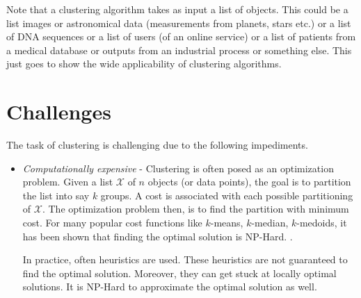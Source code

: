 \documentclass[letterpaper,12pt,titlepage,oneside,final]{book}
\newcommand{\mc}{\mathcal}
\begin{document}
Note that a clustering algorithm takes as input a list of objects. This could be a list images or astronomical data (measurements from planets, stars etc.) or a list of DNA sequences or a list of users (of an online service) or a list of patients from a medical database or outputs from an industrial process or something else. This just goes to show the wide applicability of clustering algorithms. 

\section{Challenges}
\label{introduction:challenges}
The task of clustering is challenging due to the following impediments. 
\begin{itemize}
	\item \emph{Computationally expensive} - Clustering is often posed as an optimization problem. Given a list $\mc X$ of $n$ objects (or data points), the goal is to partition the list into say $k$ groups. A cost is associated with each possible partitioning of $\mc X$. The optimization problem then, is to find the partition with minimum cost. For many popular cost functions like $k$-means, $k$-median, $k$-medoids, it has been shown that finding the optimal solution is NP-Hard. \cite{dasgupta2008hardness,megiddo1984complexity}. 
	
	In practice, often heuristics are used. These heuristics are not guaranteed to find the optimal solution. Moreover, they can get stuck at locally optimal solutions. It is NP-Hard to approximate the optimal solution as well. 
	

\end{itemize}
\end{document}
